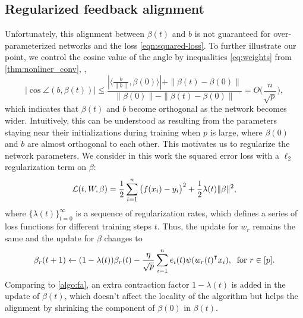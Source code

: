 \subsection{Regularized feedback alignment}
Unfortunately, this alignment between $\beta(t)$ and $b$ is not guaranteed for over-parameterized networks and the loss \eqref{eqn:squared-loss}. To further illustrate our point, we control the cosine value of the angle by inequalities \eqref{eq:weights} from \cref{thm:nonliner_conv}, \ie,
\begin{equation}
    \Big|\cos\angle(b, \beta(t))\Big| \leq \frac{|\langle \frac{b}{\|b\|}, \beta(0)\rangle|+ \|\beta(t)- \beta(0)\|}{\|\beta(0)\|-\|\beta(t)-\beta(0)\|} = O\big(\frac{n}{\sqrt p}\big),
\end{equation}
which indicates that $\beta(t)$ and $b$ become orthogonal as the network becomes wider. Intuitively, this can be understood as resulting from the parameters staying near their initializations during training when $p$ is large, where $\beta(0)$ and $b$ are almost orthogonal to each other. This motivates us to regularize the network parameters. We consider in this work the squared error loss with a $\ell_2$ regularization term on $\beta$:
\begin{equation}
\label{eqn:loss-with-reg}
\mathcal{L}(t, W, \beta) = \frac{1}{2}\sum_{i=1}^n\big(f(x_i)-y_i\big)^2 + \frac{1}{2}\lambda(t)\|\beta\|^2,
\end{equation}
where $\{\lambda(t)\}_{t=0}^\infty$ is a sequence of regularization rates, which defines a series of loss functions for different training steps $t$.
Thus, the update for $w_r$ remains the same and the
update for $\beta$ changes to
$$\beta_r(t+1) \gets (1-\lambda(t))\beta_r(t) - \frac{\eta}{\sqrt p} \sum_{i=1}^n e_i(t)\psi(w_r(t)\transpose x_i), \;\;\mbox{for $r\in[p]$.}$$
Comparing to \cref{algo:fa}, an extra contraction factor $1-\lambda(t)$ is added in the update of $\beta(t)$, which doesn't affect the locality of the algorithm but helps the alignment by shrinking the component of $\beta(0)$ in $\beta(t)$.



